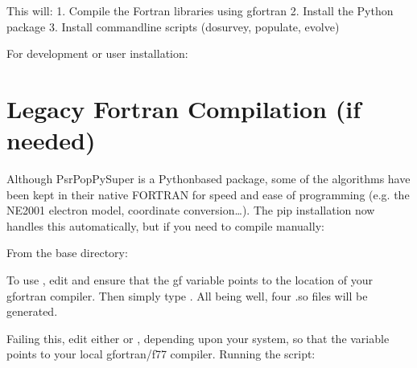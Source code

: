 \documentclass[letterpaper,10pt,english]{sphinxmanual}
\begin{document}
\sphinxAtStartPar
This will:
1. Compile the Fortran libraries using gfortran
2. Install the Python package
3. Install command\sphinxhyphen{}line scripts (dosurvey, populate, evolve)

\sphinxAtStartPar
For development or user installation:

\begin{sphinxVerbatim}[commandchars=\\\{\}]
     
     
\end{sphinxVerbatim}


\section{Legacy Fortran Compilation (if needed)}
\label{\detokenize{installation:legacy-fortran-compilation-if-needed}}\label{\detokenize{installation:legacy-compiling-fortran}}
\sphinxAtStartPar
Although PsrPopPySuper is a Python\sphinxhyphen{}based package, some of the algorithms
have been kept in their native FORTRAN for speed and ease of
programming (e.g. the NE2001 electron model, coordinate conversion…).
The pip installation now handles this automatically, but if you need
to compile manually:

\sphinxAtStartPar
From the base directory:

\begin{sphinxVerbatim}[commandchars=\\\{\}]
 
\end{sphinxVerbatim}

\sphinxAtStartPar
To use , edit  and ensure that the gf variable
points to the location of your gfortran compiler. Then simply type .
All being well, four .so files will be generated.

\sphinxAtStartPar
Failing this, edit either  or , depending upon
your system, so that the  variable points to your local gfortran/f77
compiler. Running the script:

\begin{sphinxVerbatim}[commandchars=\\\{\}]
 
\end{sphinxVerbatim}
\end{document}
